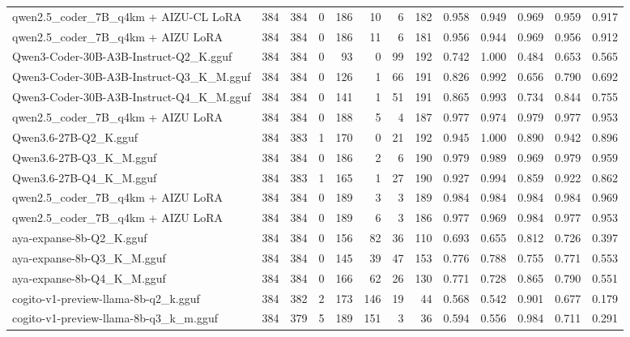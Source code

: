 \begin{table}[htbp]
{\begin{tabular}{lrrrrrrrrrrrr}
    qwen2.5\_coder\_7B\_q4km + AIZU-CL LoRA & 384 & 384 & 0 & 186 & 10 & 6 & 182 & 0.958 & 0.949 & 0.969 & 0.959 & 0.917 \\
    qwen2.5\_coder\_7B\_q4km + AIZU LoRA & 384 & 384 & 0 & 186 & 11 & 6 & 181 & 0.956 & 0.944 & 0.969 & 0.956 & 0.912 \\
    Qwen3-Coder-30B-A3B-Instruct-Q2\_K.gguf & 384 & 384 & 0 & 93 & 0 & 99 & 192 & 0.742 & 1.000 & 0.484 & 0.653 & 0.565 \\
    Qwen3-Coder-30B-A3B-Instruct-Q3\_K\_M.gguf & 384 & 384 & 0 & 126 & 1 & 66 & 191 & 0.826 & 0.992 & 0.656 & 0.790 & 0.692 \\
    Qwen3-Coder-30B-A3B-Instruct-Q4\_K\_M.gguf & 384 & 384 & 0 & 141 & 1 & 51 & 191 & 0.865 & 0.993 & 0.734 & 0.844 & 0.755 \\
    qwen2.5\_coder\_7B\_q4km + AIZU LoRA & 384 & 384 & 0 & 188 & 5 & 4 & 187 & 0.977 & 0.974 & 0.979 & 0.977 & \cellcolor{green!20}0.953 \\
    Qwen3.6-27B-Q2\_K.gguf & 384 & 383 & 1 & 170 & 0 & 21 & 192 & 0.945 & 1.000 & 0.890 & 0.942 & 0.896 \\
    Qwen3.6-27B-Q3\_K\_M.gguf & 384 & 384 & 0 & 186 & 2 & 6 & 190 & 0.979 & 0.989 & 0.969 & 0.979 & \cellcolor{green!40}0.959 \\
    Qwen3.6-27B-Q4\_K\_M.gguf & 384 & 383 & 1 & 165 & 1 & 27 & 190 & 0.927 & 0.994 & 0.859 & 0.922 & 0.862 \\
    qwen2.5\_coder\_7B\_q4km + AIZU LoRA & 384 & 384 & 0 & 189 & 3 & 3 & 189 & 0.984 & 0.984 & 0.984 & 0.984 & \cellcolor{green!50}0.969 \\
    qwen2.5\_coder\_7B\_q4km + AIZU LoRA & 384 & 384 & 0 & 189 & 6 & 3 & 186 & 0.977 & 0.969 & 0.984 & 0.977 & \cellcolor{green!30}0.953 \\
    aya-expanse-8b-Q2\_K.gguf & 384 & 384 & 0 & 156 & 82 & 36 & 110 & 0.693 & 0.655 & 0.812 & 0.726 & 0.397 \\
    aya-expanse-8b-Q3\_K\_M.gguf & 384 & 384 & 0 & 145 & 39 & 47 & 153 & 0.776 & 0.788 & 0.755 & 0.771 & 0.553 \\
    aya-expanse-8b-Q4\_K\_M.gguf & 384 & 384 & 0 & 166 & 62 & 26 & 130 & 0.771 & 0.728 & 0.865 & 0.790 & 0.551 \\
    cogito-v1-preview-llama-8b-q2\_k.gguf & 384 & 382 & 2 & 173 & 146 & 19 & 44 & 0.568 & 0.542 & 0.901 & 0.677 & 0.179 \\
    cogito-v1-preview-llama-8b-q3\_k\_m.gguf & 384 & 379 & 5 & 189 & 151 & 3 & 36 & 0.594 & 0.556 & 0.984 & 0.711 & 0.291 \\

\end{tabular}}
\end{table}
